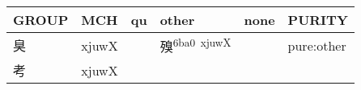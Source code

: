 \documentclass[14pt,a4paper]{scrartcl}
\begin{document}
\begin{longtable}[c]{@{}llllll@{}}
\toprule
\begin{minipage}[b]{0.14\columnwidth}\raggedright\strut
GROUP
\strut\end{minipage} &
\begin{minipage}[b]{0.14\columnwidth}\raggedright\strut
MCH
\strut\end{minipage} &
\begin{minipage}[b]{0.14\columnwidth}\raggedright\strut
qu
\strut\end{minipage} &
\begin{minipage}[b]{0.14\columnwidth}\raggedright\strut
other
\strut\end{minipage} &
\begin{minipage}[b]{0.14\columnwidth}\raggedright\strut
none
\strut\end{minipage} &
\begin{minipage}[b]{0.14\columnwidth}\raggedright\strut
PURITY
\strut\end{minipage}\tabularnewline
\midrule
\endhead
\begin{minipage}[t]{0.14\columnwidth}\raggedright\strut
臭
\strut\end{minipage} &
\begin{minipage}[t]{0.14\columnwidth}\raggedright\strut
xjuwX
\strut\end{minipage} &
\begin{minipage}[t]{0.14\columnwidth}\raggedright\strut
\strut\end{minipage} &
\begin{minipage}[t]{0.14\columnwidth}\raggedright\strut
殠\textsuperscript{6ba0~xjuwX}
\strut\end{minipage} &
\begin{minipage}[t]{0.14\columnwidth}\raggedright\strut
\strut\end{minipage} &
\begin{minipage}[t]{0.14\columnwidth}\raggedright\strut
pure:other
\strut\end{minipage}\tabularnewline
\begin{minipage}[t]{0.14\columnwidth}\raggedright\strut
考
\strut\end{minipage} &
\begin{minipage}[t]{0.14\columnwidth}\raggedright\strut
xjuwX
\strut\end{minipage} &
\begin{minipage}[t]{0.14\columnwidth}\raggedright\strut
\strut\end{minipage} &

\end{longtable}
\end{document}

